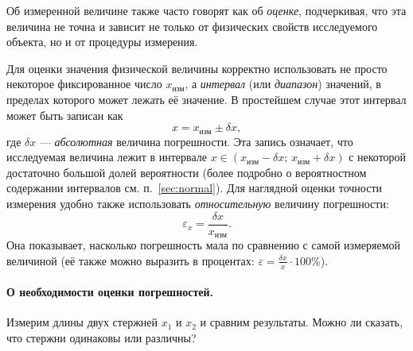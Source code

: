 Об измеренной величине также часто говорят как об \emph{оценке}, подчеркивая,
что эта величина не точна и зависит не только от физических свойств
исследуемого объекта, но и от процедуры измерения.


Для оценки значения физической величины корректно использовать
не просто некоторое фиксированное число $x_{\text{изм}}$, а \emph{интервал} (или
\emph{диапазон}) значений, в пределах которого может лежать её
 значение. В простейшем случае этот интервал
может быть записан как
\[
x=x_{\text{изм}}\pm\delta x,
\]
где $\delta x$ --- \emph{абсолютная} величина погрешности.
Эта запись означает, что исследуемая величина лежит в интервале
$x\in(x_{\text{изм}}-\delta x;\,x_{\text{изм}}+\delta x)$
с некоторой достаточно большой долей вероятности (более подробно о
вероятностном содержании интервалов см. п.~\ref{sec:normal}).
Для наглядной оценки точности измерения удобно также использовать
\emph{относительную} величину погрешности:
\[
\varepsilon_{x}=\frac{\delta x}{x_{\text{изм}}}.
\]
Она показывает, насколько погрешность мала по сравнению с
самой измеряемой величиной (её также можно выразить в процентах:
$\varepsilon=\frac{\delta x}{x}\cdot100\%$).


\paragraph{О необходимости оценки погрешностей.}

Измерим длины двух стержней $x_{1}$ и $x_{2}$ и сравним результаты.
Можно ли сказать, что стержни одинаковы или различны?

